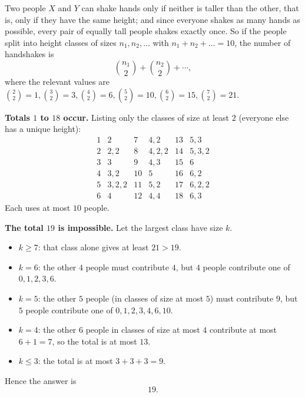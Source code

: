 Two people $X$ and $Y$ can shake hands only if neither is taller than the other, that is, only if they have the same height; and since everyone shakes as many hands as possible, every pair of equally tall people shakes exactly once. So if the people split into height classes of sizes $n_1,n_2,\dots$ with $n_1+n_2+\dots=10$, the number of handshakes is
\[\binom{n_1}{2}+\binom{n_2}{2}+\cdots,\]
where the relevant values are $\binom22=1,\binom32=3,\binom42=6,\binom52=10,\binom62=15,\binom72=21$.

\textbf{Totals $1$ to $18$ occur.} Listing only the classes of size at least $2$ (everyone else has a unique height):
\[
\begin{array}{c|c||c|c||c|c}
1 & 2 & 7 & 4,2 & 13 & 5,3\\
2 & 2,2 & 8 & 4,2,2 & 14 & 5,3,2\\
3 & 3 & 9 & 4,3 & 15 & 6\\
4 & 3,2 & 10 & 5 & 16 & 6,2\\
5 & 3,2,2 & 11 & 5,2 & 17 & 6,2,2\\
6 & 4 & 12 & 4,4 & 18 & 6,3
\end{array}
\]
Each uses at most $10$ people.

\textbf{The total $19$ is impossible.} Let the largest class have size $k$.
\begin{itemize}
\item $k\ge7$: that class alone gives at least $21>19$.
\item $k=6$: the other $4$ people must contribute $4$, but $4$ people contribute one of $0,1,2,3,6$.
\item $k=5$: the other $5$ people (in classes of size at most $5$) must contribute $9$, but $5$ people contribute one of $0,1,2,3,4,6,10$.
\item $k=4$: the other $6$ people in classes of size at most $4$ contribute at most $6+1=7$, so the total is at most $13$.
\item $k\le3$: the total is at most $3+3+3=9$.
\end{itemize}
Hence the answer is
\[\boxed{19}.\]
